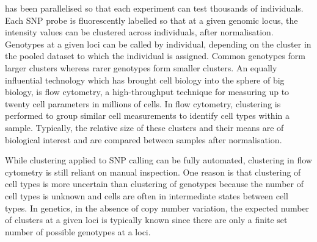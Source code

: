 has been parallelised so that each experiment can test thousands of individuals.
Each SNP probe is fluorescently labelled so that at a given genomic locus, the intensity values can be clustered across individuals, 
after normalisation.
Genotypes at a given loci can be called by individual, depending on the cluster in the pooled dataset to which the individual is assigned.
Common genotypes form larger clusters whereas rarer genotypes form smaller clusters.
An equally influential technology which has brought cell biology into the sphere of big biology, is flow cytometry,
a high-throughput technique for measuring up to twenty cell parameters in millions of cells.
In flow cytometry, clustering is performed to group similar cell measurements to identify cell types within a sample.
Typically, the relative size of these clusters and their means are of biological interest and are compared between samples after normalisation.

While clustering applied to \gls{SNP} calling can be fully automated,
clustering in flow cytometry is still reliant on manual inspection.
One reason is that
clustering of cell types is more uncertain than clustering of genotypes because the number of cell types is unknown and
cells are often in intermediate states between cell types.
In genetics, in the absence of copy number variation,
the expected number of clusters at a given loci is typically known
since there are only a finite set number of possible genotypes at a loci.


